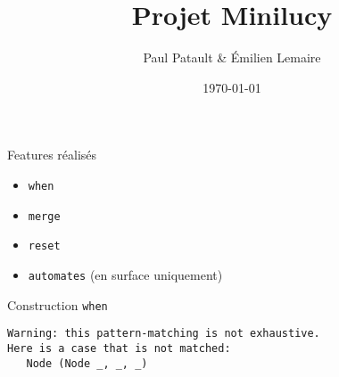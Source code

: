 \documentclass{beamer}
\title{Projet Minilucy}
\date{\today}
\author{Paul Patault \& Émilien Lemaire}
\institute{ENS Paris-Saclay}
\begin{document}
\maketitle


\begin{frame}{Features réalisés}
  \begin{itemize}[label=$\vcenter{\hbox{\scriptsize$\bullet$}}$]
    \item \texttt{when}
    \item \texttt{merge}
    \item \texttt{reset}
    \item \texttt{automates} (en surface uniquement)
  \end{itemize}
\end{frame}

\begin{frame}[fragile]{Construction \texttt{when}}
     \scriptsize
     \begin{verbatim}
Warning: this pattern-matching is not exhaustive.
Here is a case that is not matched:
   Node (Node _, _, _)
     \end{verbatim}
\end{frame}


\end{document}
